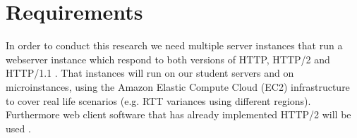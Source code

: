 \section{Requirements}
\label{req}
In order to conduct this research we need multiple server instances that run a webserver instance which respond to both versions of HTTP, HTTP/2 and HTTP/1.1 \cite{http2-imp}. That instances will run on our student servers and on microinstances, using the Amazon Elastic Compute Cloud (EC2) \cite{amazon} infrastructure to cover real life scenarios (e.g. RTT variances using different regions). Furthermore web client software that has already implemented HTTP/2 will be used \cite{mozilla}. 
